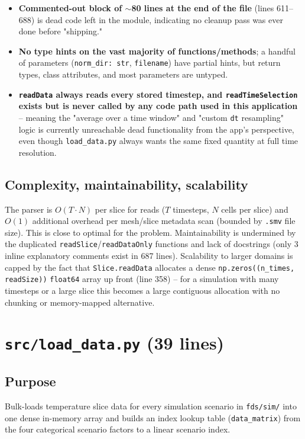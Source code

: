 \documentclass[11pt,a4paper]{report}
\begin{document}
\begin{itemize}[nosep]
575--609 are copy-pasted verbatim except for the final return statement (one returns 5 values, the
other only \texttt{data}). This is a direct SOLID/DRY violation (Section~\ref{sec:solid}).
\item \textbf{Commented-out block of $\sim$80 lines at the end of the file} (lines 611--688) is dead
code left in the module, indicating no cleanup pass was ever done before "shipping."
\item \textbf{No type hints on the vast majority of functions/methods}; a handful of parameters
(\texttt{norm\_dir: str}, \texttt{filename}) have partial hints, but return types, class attributes,
and most parameters are untyped.
\item \textbf{\texttt{readData} always reads every stored timestep, and \texttt{readTimeSelection}
exists but is never called by any code path used in this application} -- meaning the "average over a
time window" and "custom \texttt{dt} resampling" logic is currently unreachable dead functionality
from the app's perspective, even though \texttt{load\_data.py} always wants the same fixed quantity at
full time resolution.
\end{itemize}

\subsection{Complexity, maintainability, scalability}
The parser is $O(T \cdot N)$ per slice for reads ($T$ timesteps, $N$ cells per slice) and
$O(1)$ additional overhead per mesh/slice metadata scan (bounded by \texttt{.smv} file size). This is
close to optimal for the problem. Maintainability is undermined by the duplicated
\texttt{readSlice}/\texttt{readDataOnly} functions and lack of docstrings (only 3 inline explanatory
comments exist in 687 lines). Scalability to larger domains is capped by the fact that
\texttt{Slice.readData} allocates a dense \texttt{np.zeros((n\_times, readSize))} \texttt{float64}
array up front (line 358) -- for a simulation with many timesteps or a large slice this becomes a
large contiguous allocation with no chunking or memory-mapped alternative.

\section{\texttt{src/load\_data.py} (39 lines)}

\subsection{Purpose}
Bulk-loads temperature slice data for every simulation scenario in \texttt{fds/sim/} into one dense
in-memory array and builds an index lookup table (\texttt{data\_matrix}) from the four categorical
scenario factors to a linear scenario index.
\end{document}
